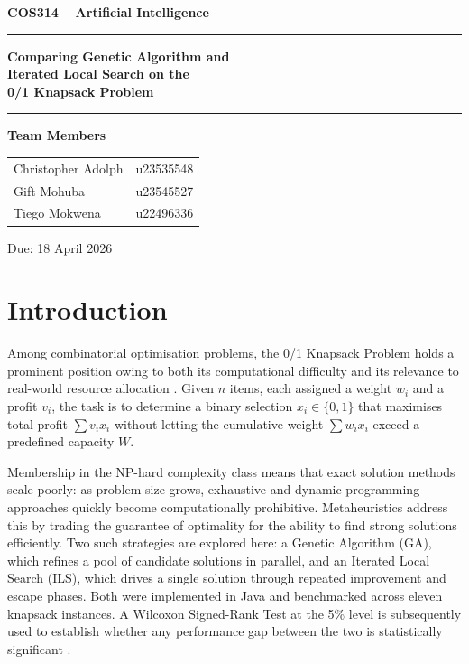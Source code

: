 \documentclass[12pt, a4paper]{article}
\begin{document}
\begin{titlepage}
    \centering
    \vspace*{3cm}
    {\Large\bfseries\color{upblue} COS314 -- Artificial Intelligence \par}
    \vspace{0.5cm}
    {\rule{\linewidth}{0.6pt}\par}
    \vspace{0.8cm}
    {\LARGE\bfseries Comparing Genetic Algorithm and\\[0.3em]
    Iterated Local Search on the\\[0.3em]
    0/1 Knapsack Problem \par}
    \vspace{0.8cm}
    {\rule{\linewidth}{0.6pt}\par}
    \vspace{2cm}
    {\large\bfseries\color{upblue} Team Members \par}
    \vspace{0.6cm}
    \begin{tabular}{ll}
        Christopher Adolph & u23535548 \\[0.4em]
        Gift Mohuba      & u23545527 \\[0.4em]
        Tiego Mokwena     & u22496336 \\
    \end{tabular}
    \vfill
    {\large Due: 18 April 2026 \par}
\end{titlepage}

\section{Introduction}

Among combinatorial optimisation problems, the 0/1 Knapsack Problem holds a prominent position owing to both its computational difficulty and its relevance to real-world resource allocation \cite{khuri1994}. Given $n$ items, each assigned a weight $w_i$ and a profit $v_i$, the task is to determine a binary selection $x_i \in \{0,1\}$ that maximises total profit $\sum v_i x_i$ without letting the cumulative weight $\sum w_i x_i$ exceed a predefined capacity $W$.

Membership in the NP-hard complexity class means that exact solution methods scale poorly: as problem size grows, exhaustive and dynamic programming approaches quickly become computationally prohibitive. Metaheuristics address this by trading the guarantee of optimality for the ability to find strong solutions efficiently. Two such strategies are explored here: a Genetic Algorithm (GA), which refines a pool of candidate solutions in parallel, and an Iterated Local Search (ILS), which drives a single solution through repeated improvement and escape phases. Both were implemented in Java and benchmarked across eleven knapsack instances. A Wilcoxon Signed-Rank Test at the 5\% level is subsequently used to establish whether any performance gap between the two is statistically significant \cite{nyathi2025}.
\end{document}
